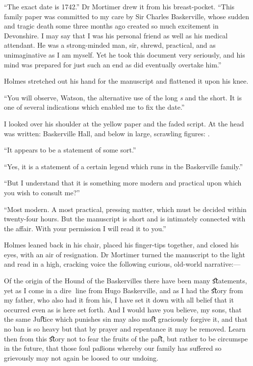 \documentclass[paper=a5,BCOR=7mm,twoside,DIV=calc,12pt,usegeometry,openany,chapterprefix,endperiod,headings=big]{scrbook} %
\begin{document}
\enquote{The exact date is 1742.} Dr Mortimer drew it from his breast-pocket. \enquote{This family paper was committed to my care by Sir Charles Baskerville, whose sudden and tragic death some three months ago created so much excitement in Devonshire. I may say that I was his personal friend as well as his medical attendant. He was a strong-minded man, sir, shrewd, practical, and as unimaginative as I am myself. Yet he took this document very seriously, and his mind was prepared for just such an end as did eventually overtake him.}

Holmes stretched out his hand for the manuscript and flattened it upon his knee.

\enquote{You will observe, Watson, the alternative use of the long \textit{s} and the short. It is one of several indications which enabled me to fix the date.}

I looked over his shoulder at the yellow paper and the faded script. At the head was written: \oldfont Baskerville Hall\normalfont, and below in large, scrawling figures: . \normalfont

\enquote{It appears to be a statement of some sort.}

\enquote{Yes, it is a statement of a certain legend which runs in the Baskerville family.}

\enquote{But I understand that it is something more modern and practical upon which you wish to consult me?}

\enquote{Most modern. A most practical, pressing matter, which must be decided within twenty-four hours. But the manuscript is short and is intimately connected with the affair. With your permission I will read it to you.}

Holmes leaned back in his chair, placed his finger-tips together, and closed his eyes, with an air of resignation. Dr Mortimer turned the manuscript to the light and read in a high, cracking voice the following curious, old-world narrative:--- \\

\vfill

\oldfont

Of the origin of the Hound of the Baskervilles there have been many ﬆatements, yet as I come in a dire line from Hugo Baskerville, and as I had the ﬆory from my father, who also had it from his, I have set it down with all belief that it occurred even as is here set forth. And I would have you believe, my sons, that the same Juﬅice which punishes sin may also moﬅ graciously forgive it, and that no ban is so heavy but that by prayer and repentance it may be removed. Learn then from this ﬆory not to fear the fruits of the paﬅ, but rather to be circumspe in the future, that those foul paßions whereby our family has suﬀered so grievously may not again be loosed to our undoing.
\end{document}

